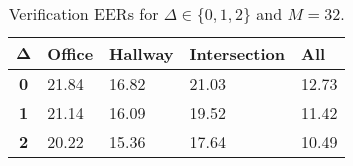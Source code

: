 \begin{table}[h]
    \centering
    \begin{tabular}{|c|M{2cm}|M{2cm}|M{2cm}|M{2cm}|}
    \hline
    $\boldsymbol{\Delta}$ & \bf{Office} & \bf{Hallway} & \bf{Intersection} & \bf{All} \\ 
    \hline 
    \hline
    \bf{0} & 21.84 & 16.82 & 21.03 & 12.73 \\
    \hline
    \bf{1} & 21.14 & 16.09 & 19.52 & 11.42 \\
    \hline
    \bf{2} & 20.22 & 15.36 & 17.64 & 10.49 \\
    \hline
    \end{tabular}
    \caption{Verification EERs for $\Delta \in \{0, 1, 2\}$ and $M = 32$.}
    \label{tab:verify_adapted_wm_M_32}
\end{table}
